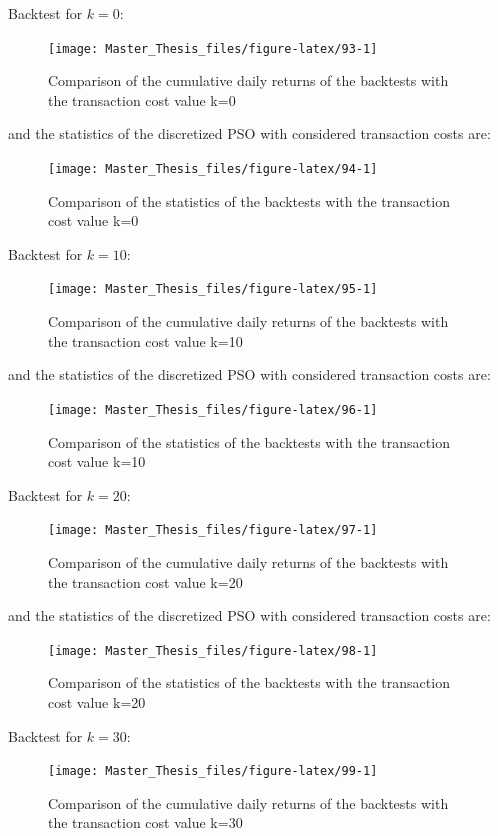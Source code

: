 \documentclass[
  oneside, a4paper, 12pt, openany]{book}
\theoremstyle{definition}
\theoremstyle{definition}
\theoremstyle{definition}
\theoremstyle{definition}
\theoremstyle{remark}
\begin{document}
Backtest for \(k=0\):

\begin{figure}[H]
\texttt{[image: Master\_Thesis\_files/figure-latex/93-1]} \caption{Comparison of the cumulative daily returns of the backtests with the transaction cost value k=0}\label{fig:93}
\end{figure}

and the statistics of the discretized PSO with considered transaction costs are:

\begin{figure}[H]
\texttt{[image: Master\_Thesis\_files/figure-latex/94-1]} \caption{Comparison of the statistics of the backtests with the transaction cost value k=0}\label{fig:94}
\end{figure}

Backtest for \(k=10\):

\begin{figure}[H]
\texttt{[image: Master\_Thesis\_files/figure-latex/95-1]} \caption{Comparison of the cumulative daily returns of the backtests with the transaction cost value k=10}\label{fig:95}
\end{figure}

and the statistics of the discretized PSO with considered transaction costs are:

\begin{figure}[H]
\texttt{[image: Master\_Thesis\_files/figure-latex/96-1]} \caption{Comparison of the statistics of the backtests with the transaction cost value k=10}\label{fig:96}
\end{figure}

Backtest for \(k=20\):

\begin{figure}[H]
\texttt{[image: Master\_Thesis\_files/figure-latex/97-1]} \caption{Comparison of the cumulative daily returns of the backtests with the transaction cost value k=20}\label{fig:97}
\end{figure}

and the statistics of the discretized PSO with considered transaction costs are:

\begin{figure}[H]
\texttt{[image: Master\_Thesis\_files/figure-latex/98-1]} \caption{Comparison of the statistics of the backtests with the transaction cost value k=20}\label{fig:98}
\end{figure}

Backtest for \(k=30\):

\begin{figure}[H]
\texttt{[image: Master\_Thesis\_files/figure-latex/99-1]} \caption{Comparison of the cumulative daily returns of the backtests with the transaction cost value k=30}\label{fig:99}
\end{figure}
\end{document}
